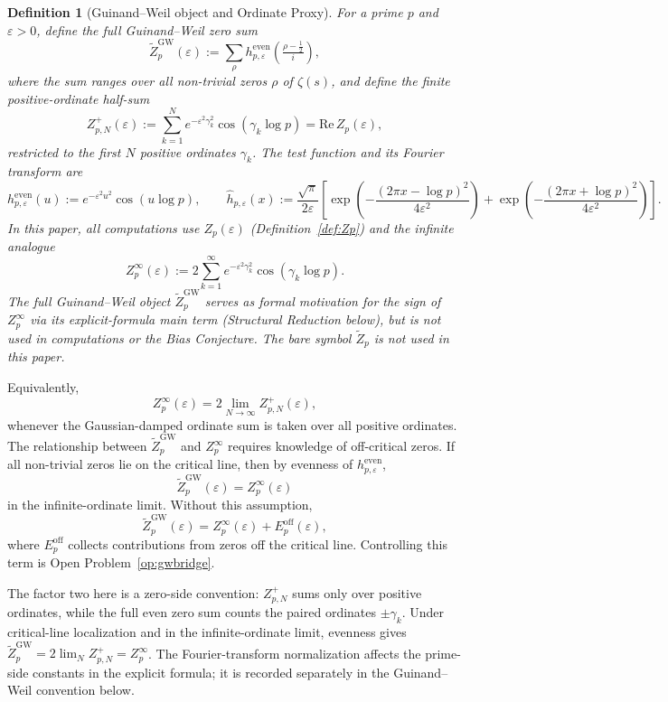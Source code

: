 \documentclass[11pt]{article}
\newtheorem{definition}[theorem]{Definition}
\begin{document}
\begin{definition}[Guinand--Weil object and Ordinate Proxy]
\label{def:Ztilde}
For a prime $p$ and $\varepsilon>0$, define the \emph{full Guinand--Weil zero sum}
\[
\widetilde Z_p^{\mathrm{GW}}(\varepsilon)
  := \sum_\rho h^{\mathrm{even}}_{p,\varepsilon}
     \!\left(\tfrac{\rho-\frac12}{i}\right),
\]
where the sum ranges over all non-trivial zeros $\rho$ of $\zeta(s)$,
and define the \emph{finite positive-ordinate half-sum}
\[
Z_{p,N}^{+}(\varepsilon)
  := \sum_{k=1}^N e^{-\varepsilon^2\gamma_k^2}
     \cos(\gamma_k\log p)
  = \mathrm{Re}\, Z_p(\varepsilon),
\]
restricted to the first $N$ positive ordinates $\gamma_k$.
The test function and its Fourier transform are
\[
h^{\mathrm{even}}_{p,\varepsilon}(u) := e^{-\varepsilon^2 u^2}\cos(u\log p),
\qquad
\hat{h}_{p,\varepsilon}(x) :=
\frac{\sqrt{\pi}}{2\varepsilon}
\left[
\exp\!\left(-\frac{(2\pi x-\log p)^2}{4\varepsilon^2}\right)
+
\exp\!\left(-\frac{(2\pi x+\log p)^2}{4\varepsilon^2}\right)
\right].
\]
In this paper, all computations use $Z_p(\varepsilon)$
(Definition~\ref{def:Zp}) and the infinite analogue
\[
  Z_p^\infty(\varepsilon)
  := 2\!\sum_{k=1}^{\infty}
     e^{-\varepsilon^2\gamma_k^2}\cos(\gamma_k\log p).
\]
The full Guinand--Weil object $\widetilde Z_p^{\mathrm{GW}}$
serves as formal motivation for the sign of $Z_p^\infty$
via its explicit-formula main term (Structural Reduction below),
but is not used in computations or the Bias Conjecture.
The bare symbol $\widetilde Z_p$ is not used in this paper.
\end{definition}

Equivalently,
\[
Z_p^\infty(\varepsilon)
=2\lim_{N\to\infty}Z_{p,N}^+(\varepsilon),
\]
whenever the Gaussian-damped ordinate sum is taken over
all positive ordinates.
The relationship between $\widetilde Z_p^{\mathrm{GW}}$
and $Z_p^\infty$ requires knowledge of off-critical zeros.
If all non-trivial zeros lie on the critical line, then
by evenness of $h^{\mathrm{even}}_{p,\varepsilon}$,
\[
\widetilde Z_p^{\mathrm{GW}}(\varepsilon)
= Z_p^\infty(\varepsilon)
\]
in the infinite-ordinate limit. Without this assumption,
\[
\widetilde Z_p^{\mathrm{GW}}(\varepsilon)
= Z_p^\infty(\varepsilon) + E_p^{\mathrm{off}}(\varepsilon),
\]
where $E_p^{\mathrm{off}}$ collects contributions from zeros off
the critical line. Controlling this term is
Open Problem~\ref{op:gwbridge}.

The factor two here is a zero-side convention: $Z_{p,N}^+$ sums only
over positive ordinates, while the full even zero sum counts the
paired ordinates $\pm\gamma_k$. Under critical-line localization and
in the infinite-ordinate limit, evenness gives
$\widetilde Z_p^{\mathrm{GW}}=2\lim_N Z_{p,N}^+=Z_p^\infty$.
The Fourier-transform normalization affects the prime-side constants
in the explicit formula; it is recorded separately in the
Guinand--Weil convention below.
\end{document}
